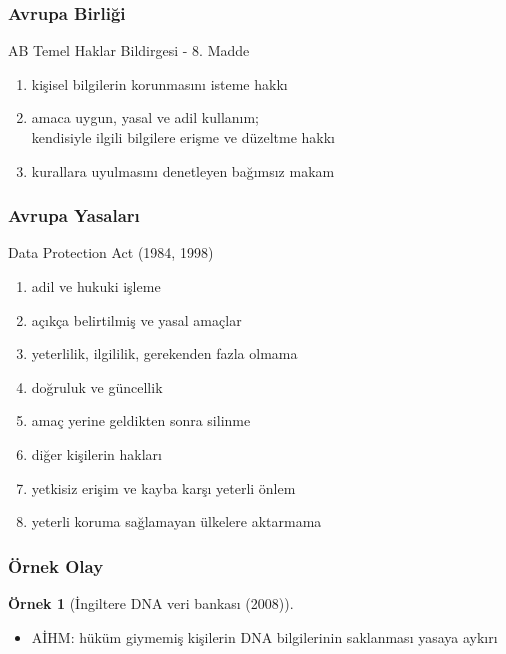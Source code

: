 \documentclass[dvipsnames]{beamer}
\theoremstyle{definition}
\theoremstyle{example}
\newtheorem{ornek}[theorem]{Örnek}
\theoremstyle{plain}
\begin{document}
\begin{frame}
  \frametitle{Avrupa Birliği}

  \begin{block}{AB Temel Haklar Bildirgesi - 8. Madde}
    \begin{enumerate}
      \item kişisel bilgilerin korunmasını isteme hakkı

      \pause
      \item amaca uygun, yasal ve adil kullanım;\\
        kendisiyle ilgili bilgilere erişme ve düzeltme hakkı

      \pause
      \item kurallara uyulmasını denetleyen bağımsız makam
    \end{enumerate}
  \end{block}
\end{frame}

\begin{frame}
  \frametitle{Avrupa Yasaları}

  \begin{block}{Data Protection Act (1984, 1998)}
    \begin{enumerate}
      \item adil ve hukuki işleme
      \item açıkça belirtilmiş ve yasal amaçlar
      \item yeterlilik, ilgililik, gerekenden fazla olmama
      \item doğruluk ve güncellik
      \item amaç yerine geldikten sonra silinme
      \item diğer kişilerin hakları
      \item yetkisiz erişim ve kayba karşı yeterli önlem
      \item yeterli koruma sağlamayan ülkelere aktarmama
    \end{enumerate}
  \end{block}
\end{frame}

\begin{frame}
  \frametitle{Örnek Olay}

  \begin{ornek}[İngiltere DNA veri bankası (2008)]
    \begin{itemize}
      \item AİHM: hüküm giymemiş kişilerin DNA bilgilerinin saklanması
        yasaya aykırı
    \end{itemize}
  \end{ornek}
\end{frame}
\end{document}
